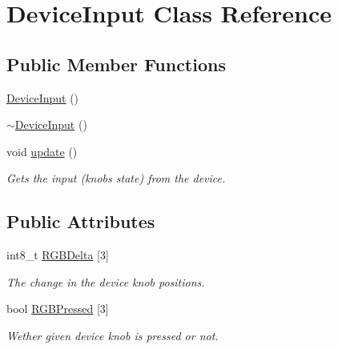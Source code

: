 \hypertarget{classDeviceInput}{}\section{Device\+Input Class Reference}
\label{classDeviceInput}
\subsection*{Public Member Functions}
\begin{DoxyCompactItemize}
\item 
\mbox{\hyperlink{classDeviceInput_a5a5d144c0a4a2d0fedfd85fcb687a716}{Device\+Input}} ()
\item 
\mbox{\hyperlink{classDeviceInput_a6c06d020cca58b3d4763e1717382b1a8}{$\sim$\+Device\+Input}} ()
\item 
\mbox{\label{classDeviceInput_ae6af261f4e6fa656dad4bd4a1efddbc6}} 
void \mbox{\hyperlink{classDeviceInput_ae6af261f4e6fa656dad4bd4a1efddbc6}{update}} ()
\begin{DoxyCompactList}\small\item\em Gets the input (knobs state) from the device. \end{DoxyCompactList}\end{DoxyCompactItemize}
\subsection*{Public Attributes}
\begin{DoxyCompactItemize}
\item 
\mbox{\label{classDeviceInput_a2dae4108527f110262644b6a2609a213}} 
int8\+\_\+t \mbox{\hyperlink{classDeviceInput_a2dae4108527f110262644b6a2609a213}{R\+G\+B\+Delta}} \mbox{[}3\mbox{]}
\begin{DoxyCompactList}\small\item\em The change in the device knob positions. \end{DoxyCompactList}\item 
\mbox{\label{classDeviceInput_a27dd22c6d022b77c645899a8793d511a}} 
bool \mbox{\hyperlink{classDeviceInput_a27dd22c6d022b77c645899a8793d511a}{R\+G\+B\+Pressed}} \mbox{[}3\mbox{]}
\begin{DoxyCompactList}\small\item\em Wether given device knob is pressed or not. \end{DoxyCompactList}\end{DoxyCompactItemize}


